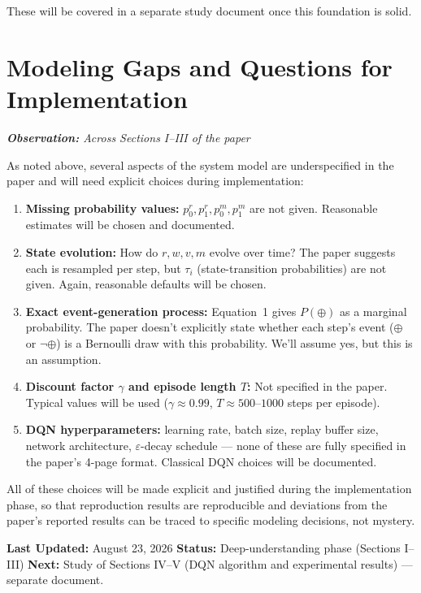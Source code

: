 \documentclass[12pt,a4paper]{article}
\begin{document}
These will be covered in a separate study document once this foundation is solid.

\section{Modeling Gaps and Questions for Implementation}

\noindent\textit{\textbf{Observation:} Across Sections I--III of the paper}

As noted above, several aspects of the system model are underspecified in the paper and will need explicit choices during implementation:

\begin{enumerate}
    \item \textbf{Missing probability values:} $p^r_0, p^r_1, p^m_0, p^m_1$ are not given. Reasonable estimates will be chosen and documented.

    \item \textbf{State evolution:} How do $r, w, v, m$ evolve over time? The paper suggests each is resampled per step, but $\tau_i$ (state-transition probabilities) are not given. Again, reasonable defaults will be chosen.

    \item \textbf{Exact event-generation process:} Equation~1 gives $P(\oplus)$ as a marginal probability. The paper doesn't explicitly state whether each step's event ($\oplus$ or $\neg\oplus$) is a Bernoulli draw with this probability. We'll assume yes, but this is an assumption.

    \item \textbf{Discount factor $\gamma$ and episode length $T$:} Not specified in the paper. Typical values will be used ($\gamma \approx 0.99$, $T \approx 500$--$1000$ steps per episode).

    \item \textbf{DQN hyperparameters:} learning rate, batch size, replay buffer size, network architecture, $\varepsilon$-decay schedule --- none of these are fully specified in the paper's 4-page format. Classical DQN choices will be documented.
\end{enumerate}

All of these choices will be made explicit and justified during the implementation phase, so that reproduction results are reproducible and deviations from the paper's reported results can be traced to specific modeling decisions, not mystery.


\vspace{2cm}
\noindent
\textbf{Last Updated:} August 23, 2026
\textbf{Status:} Deep-understanding phase (Sections I--III)
\textbf{Next:} Study of Sections IV--V (DQN algorithm and experimental results) --- separate document.
\end{document}

